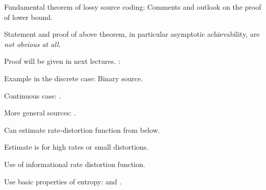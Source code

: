 \begin{frame}{Fundamental theorem of lossy source coding: Comments and outlook on the proof of lower bound.}

\bit
\item Statement and proof of above theorem, in particular asymptotic achievability, are \textit{not obvious at all}. 
\item Proof will be given in next lectures. 
\eit
\vspace{-2.5mm}
:
\bit
\item Example in the discrete case: Binary source. 
\item Continuous case: .
\item More general sources: . 
\bit
\item Can estimate rate-distortion function from below. 
\item Estimate 
is  for high rates or small distortions.  
\eit 
\eit 

\bit
\item Use  of informational rate distortion function. 
\item Use basic properties of entropy:  and . 
\eit 
\end{frame}


